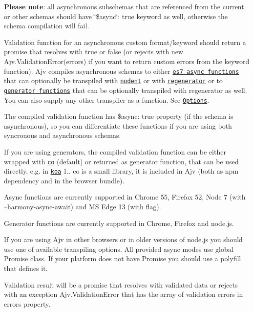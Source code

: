 {\bfseries Please note}\+: all asynchronous subschemas that are referenced from the current or other schemas should have {\ttfamily \char`\"{}\$async\char`\"{}\+: true} keyword as well, otherwise the schema compilation will fail.

Validation function for an asynchronous custom format/keyword should return a promise that resolves with {\ttfamily true} or {\ttfamily false} (or rejects with {\ttfamily new Ajv.\+Validation\+Error(errors)} if you want to return custom errors from the keyword function). Ajv compiles asynchronous schemas to either \href{http://tc39.github.io/ecmascript-asyncawait/}{\tt es7 async functions} that can optionally be transpiled with \href{https://github.com/MatAtBread/nodent}{\tt nodent} or with \href{https://github.com/facebook/regenerator}{\tt regenerator} or to \href{https://developer.mozilla.org/en-US/docs/Web/JavaScript/Reference/Statements/function*}{\tt generator functions} that can be optionally transpiled with regenerator as well. You can also supply any other transpiler as a function. See \href{#options}{\tt Options}.

The compiled validation function has {\ttfamily \$async\+: true} property (if the schema is asynchronous), so you can differentiate these functions if you are using both syncronous and asynchronous schemas.

If you are using generators, the compiled validation function can be either wrapped with \href{https://github.com/tj/co}{\tt co} (default) or returned as generator function, that can be used directly, e.\+g. in \href{http://koajs.com/}{\tt koa} 1.. {\ttfamily co} is a small library, it is included in Ajv (both as npm dependency and in the browser bundle).

Async functions are currently supported in Chrome 55, Firefox 52, Node 7 (with --harmony-\/async-\/await) and MS Edge 13 (with flag).

Generator functions are currently supported in Chrome, Firefox and node.\+js.

If you are using Ajv in other browsers or in older versions of node.\+js you should use one of available transpiling options. All provided async modes use global Promise class. If your platform does not have Promise you should use a polyfill that defines it.

Validation result will be a promise that resolves with validated data or rejects with an exception {\ttfamily Ajv.\+Validation\+Error} that has the array of validation errors in {\ttfamily errors} property.

